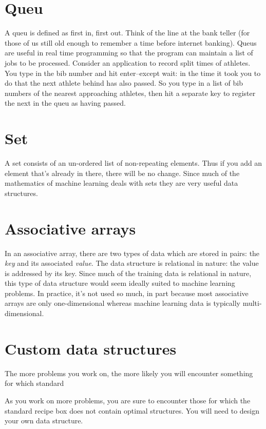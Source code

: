 \documentclass{article}
\begin{document}
\section{Queu}

A queu is defined as first in, first out. Think of the line at the bank 
teller (for those of us still old enough to remember a time before internet
banking). Queus are useful in real time programming so that the program can
maintain a list of jobs to be processed. Consider an application to record
split times of athletes. You type in the bib number and hit enter--except wait:
in the time it took you to do that the next athlete behind has also passed.
So you type in a list of bib numbers of the nearest approaching athletes, 
then hit a separate key to register the next in the queu as having passed.

\section{Set}

A set consists of an un-ordered list of non-repeating elements.
Thus if you add an element that's already in there, there will be no change.
Since much of the mathematics of machine learning deals with sets they are
very useful data structures.

\section{Associative arrays}

In an associative array, there are two types of data which are stored in pairs:
the {\it key} and its associated {\it value}. 
The data structure is relational in nature: the value is addressed by its key.
Since much of the training data is relational
in nature, this type of data structure would seem ideally suited
to machine learning problems.
In practice, it's not used so much, in part because most associative arrays
are only one-dimensional whereas machine learning data is typically
multi-dimensional.

\section{Custom data structures}

The more problems you work on, the more likely you will encounter something
for which standard 

As you work on more problems, you are sure to encounter those for which the
standard recipe box does not contain optimal structures.
You will need to design your own data structure.
\end{document}
